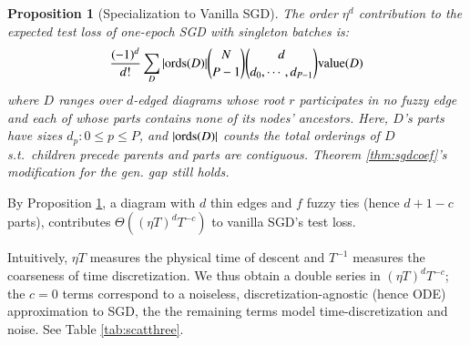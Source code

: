 \documentclass{article}
\theoremstyle{plain}
\newtheorem{prop}{Proposition}
\theoremstyle{definition}
\newtheorem{exm}{Example}
\newcommand{\wrap}[1]{\left(#1\right)}
\newcommand{\dvalue}{\text{\textnormal{value}}}
\newcommand{\ords}{\text{\textnormal{ords}}}
\begin{document}
        \begin{prop}[Specialization to Vanilla SGD] \label{prop:vanilla}
            The order $\eta^d$ contribution to the expected test loss of
            one-epoch SGD with singleton batches is:
            \begin{equation*}\label{eq:sgdbasiccoef}
                \frac{(-1)^d}{d!} \sum_{D} 
                |\ords(D)| {N \choose P-1} {d \choose d_0,\cdots,d_{P-1}}
                \dvalue(D)
            \end{equation*}
            where $D$ ranges over $d$-edged diagrams whose root $r$
            participates in no fuzzy edge and each of whose parts contains
            none of its nodes' ancestors.  Here, $D$'s parts have sizes
            $d_p: 0\leq p\leq P$, and $|\ords(D)|$ counts the total
            orderings of $D$ s.t.\ children precede parents and parts are
            contiguous.
            Theorem \ref{thm:sgdcoef}'s modification for the gen. gap still
            holds.
        \end{prop}

        By Proposition \ref{prop:vanilla}, a diagram with $d$ thin edges and
        $f$ fuzzy ties (hence $d+1-c$ parts), contributes $\Theta\wrap{(\eta
        T)^d T^{-c}}$ to vanilla SGD's test loss.  
        
        Intuitively, $\eta T$ measures the physical time of descent and
        $T^{-1}$ measures the coarseness of time discretization.  We thus
        obtain a double series in $(\eta T)^d T^{-c}$; the $c=0$ terms
        correspond to a noiseless, discretization-agnostic (hence ODE)
        approximation to SGD, the the remaining terms model time-discretization
        and noise.  See Table \ref{tab:scatthree}. 

\end{document}
